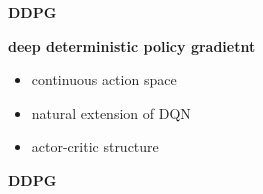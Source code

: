 \documentclass[xcolor=dvipsnames]{beamer}
\begin{document}
\begin{frame}{\bf DDPG}

  {\bf deep deterministic policy gradietnt}

  \begin{itemize}
    \item continuous action space
    \item natural extension of DQN
    \item actor-critic structure
  \end{itemize}


\end{frame}




\begin{frame}{\bf DDPG}


\end{frame}
\end{document}
